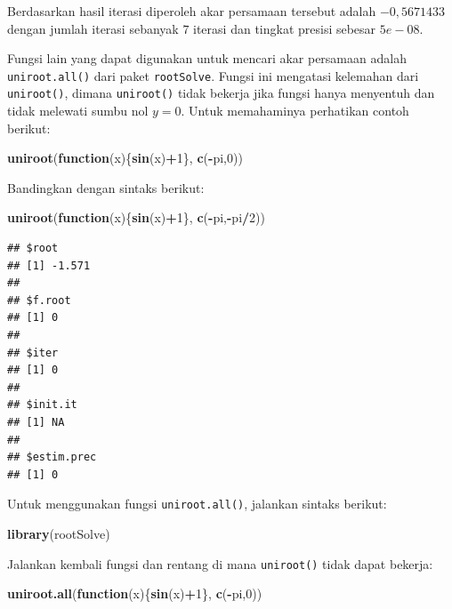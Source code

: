 \documentclass[
]{book}
\newenvironment{Shaded}{\begin{snugshade}}{\end{snugshade}}
\newcommand{\ControlFlowTok}[1]{\textcolor[rgb]{0.13,0.29,0.53}{\textbf{#1}}}
\newcommand{\DecValTok}[1]{\textcolor[rgb]{0.00,0.00,0.81}{#1}}
\newcommand{\FunctionTok}[1]{\textcolor[rgb]{0.13,0.29,0.53}{\textbf{#1}}}
\newcommand{\NormalTok}[1]{#1}
\newcommand{\SpecialCharTok}[1]{\textcolor[rgb]{0.81,0.36,0.00}{\textbf{#1}}}
\theoremstyle{definition}
\theoremstyle{definition}
\theoremstyle{definition}
\theoremstyle{definition}
\theoremstyle{remark}
\begin{document}
Berdasarkan hasil iterasi diperoleh akar persamaan tersebut adalah \(-0,5671433\) dengan jumlah iterasi sebanyak \(7\) iterasi dan tingkat presisi sebesar \(5e-08\).

Fungsi lain yang dapat digunakan untuk mencari akar persamaan adalah \texttt{uniroot.all()} dari paket \texttt{rootSolve}. Fungsi ini mengatasi kelemahan dari \texttt{uniroot()}, dimana \texttt{uniroot()} tidak bekerja jika fungsi hanya menyentuh dan tidak melewati sumbu nol \(y=0\). Untuk memahaminya perhatikan contoh berikut:

\begin{Shaded}
\begin{Highlighting}[]
\FunctionTok{uniroot}\NormalTok{(}\ControlFlowTok{function}\NormalTok{(x)\{}\FunctionTok{sin}\NormalTok{(x)}\SpecialCharTok{+}\DecValTok{1}\NormalTok{\}, }\FunctionTok{c}\NormalTok{(}\SpecialCharTok{{-}}\NormalTok{pi,}\DecValTok{0}\NormalTok{))}
\end{Highlighting}
\end{Shaded}

Bandingkan dengan sintaks berikut:

\begin{Shaded}
\begin{Highlighting}[]
\FunctionTok{uniroot}\NormalTok{(}\ControlFlowTok{function}\NormalTok{(x)\{}\FunctionTok{sin}\NormalTok{(x)}\SpecialCharTok{+}\DecValTok{1}\NormalTok{\}, }\FunctionTok{c}\NormalTok{(}\SpecialCharTok{{-}}\NormalTok{pi,}\SpecialCharTok{{-}}\NormalTok{pi}\SpecialCharTok{/}\DecValTok{2}\NormalTok{))}
\end{Highlighting}
\end{Shaded}

\begin{verbatim}
## $root
## [1] -1.571
## 
## $f.root
## [1] 0
## 
## $iter
## [1] 0
## 
## $init.it
## [1] NA
## 
## $estim.prec
## [1] 0
\end{verbatim}

Untuk menggunakan fungsi \texttt{uniroot.all()}, jalankan sintaks berikut:

\begin{Shaded}
\begin{Highlighting}[]
\FunctionTok{library}\NormalTok{(rootSolve)}
\end{Highlighting}
\end{Shaded}

Jalankan kembali fungsi dan rentang di mana \texttt{uniroot()} tidak dapat bekerja:

\begin{Shaded}
\begin{Highlighting}[]
\FunctionTok{uniroot.all}\NormalTok{(}\ControlFlowTok{function}\NormalTok{(x)\{}\FunctionTok{sin}\NormalTok{(x)}\SpecialCharTok{+}\DecValTok{1}\NormalTok{\}, }\FunctionTok{c}\NormalTok{(}\SpecialCharTok{{-}}\NormalTok{pi,}\DecValTok{0}\NormalTok{))}
\end{Highlighting}
\end{Shaded}
\end{document}
